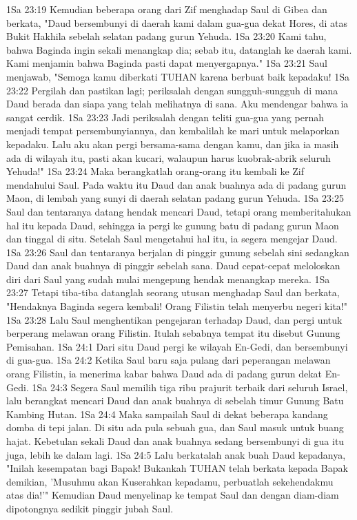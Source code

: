 1Sa 23:19  Kemudian beberapa orang dari Zif menghadap Saul di Gibea dan berkata, "Daud bersembunyi di daerah kami dalam gua-gua dekat Hores, di atas Bukit Hakhila sebelah selatan padang gurun Yehuda.
1Sa 23:20  Kami tahu, bahwa Baginda ingin sekali menangkap dia; sebab itu, datanglah ke daerah kami. Kami menjamin bahwa Baginda pasti dapat menyergapnya."
1Sa 23:21  Saul menjawab, "Semoga kamu diberkati TUHAN karena berbuat baik kepadaku!
1Sa 23:22  Pergilah dan pastikan lagi; periksalah dengan sungguh-sungguh di mana Daud berada dan siapa yang telah melihatnya di sana. Aku mendengar bahwa ia sangat cerdik.
1Sa 23:23  Jadi periksalah dengan teliti gua-gua yang pernah menjadi tempat persembunyiannya, dan kembalilah ke mari untuk melaporkan kepadaku. Lalu aku akan pergi bersama-sama dengan kamu, dan jika ia masih ada di wilayah itu, pasti akan kucari, walaupun harus kuobrak-abrik seluruh Yehuda!"
1Sa 23:24  Maka berangkatlah orang-orang itu kembali ke Zif mendahului Saul. Pada waktu itu Daud dan anak buahnya ada di padang gurun Maon, di lembah yang sunyi di daerah selatan padang gurun Yehuda.
1Sa 23:25  Saul dan tentaranya datang hendak mencari Daud, tetapi orang memberitahukan hal itu kepada Daud, sehingga ia pergi ke gunung batu di padang gurun Maon dan tinggal di situ. Setelah Saul mengetahui hal itu, ia segera mengejar Daud.
1Sa 23:26  Saul dan tentaranya berjalan di pinggir gunung sebelah sini sedangkan Daud dan anak buahnya di pinggir sebelah sana. Daud cepat-cepat meloloskan diri dari Saul yang sudah mulai mengepung hendak menangkap mereka.
1Sa 23:27  Tetapi tiba-tiba datanglah seorang utusan menghadap Saul dan berkata, "Hendaknya Baginda segera kembali! Orang Filistin telah menyerbu negeri kita!"
1Sa 23:28  Lalu Saul menghentikan pengejaran terhadap Daud, dan pergi untuk berperang melawan orang Filistin. Itulah sebabnya tempat itu disebut Gunung Pemisahan.
1Sa 24:1  Dari situ Daud pergi ke wilayah En-Gedi, dan bersembunyi di gua-gua.
1Sa 24:2  Ketika Saul baru saja pulang dari peperangan melawan orang Filistin, ia menerima kabar bahwa Daud ada di padang gurun dekat En-Gedi.
1Sa 24:3  Segera Saul memilih tiga ribu prajurit terbaik dari seluruh Israel, lalu berangkat mencari Daud dan anak buahnya di sebelah timur Gunung Batu Kambing Hutan.
1Sa 24:4  Maka sampailah Saul di dekat beberapa kandang domba di tepi jalan. Di situ ada pula sebuah gua, dan Saul masuk untuk buang hajat. Kebetulan sekali Daud dan anak buahnya sedang bersembunyi di gua itu juga, lebih ke dalam lagi.
1Sa 24:5  Lalu berkatalah anak buah Daud kepadanya, "Inilah kesempatan bagi Bapak! Bukankah TUHAN telah berkata kepada Bapak demikian, 'Musuhmu akan Kuserahkan kepadamu, perbuatlah sekehendakmu atas dia!'" Kemudian Daud menyelinap ke tempat Saul dan dengan diam-diam dipotongnya sedikit pinggir jubah Saul.
